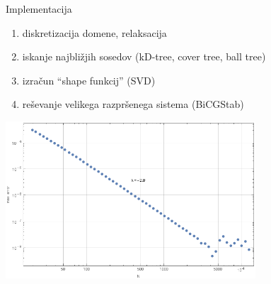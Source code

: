\documentclass[t]{beamer} %
\begin{document}
\begin{frame}{Implementacija}
  \begin{enumerate}
    \item diskretizacija domene, relaksacija
    \item iskanje najbližjih sosedov (kD-tree, cover tree, ball tree)
    \item izračun ``shape funkcij'' (SVD)
    \item reševanje velikega razpršenega sistema (BiCGStab)
  \end{enumerate}
  \centering
  \includegraphics[width=0.7\textwidth]{MLSMerr.png}
\end{frame}
\end{document}
